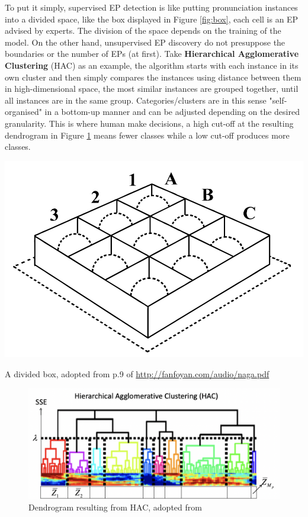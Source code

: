\documentclass[nobib]{tufte-handout}
\begin{document}
To put it simply, supervised EP detection is like putting pronunciation instances into a divided space, like the box displayed in Figure \ref{fig:box}, each cell is an EP advised by experts. The division of the space depends on the training of the model. On the other hand, unsupervised EP discovery do not presuppose the boundaries or the number of EPs (at first). Take \textbf{Hierarchical Agglomerative Clustering} (HAC) as an example, the algorithm starts with each instance in its own cluster and then simply compares the instances using distance between them in high-dimensional space, the most similar instances are grouped together, until all instances are in the same group. Categories/clusters are in this sense "self-organised" in a bottom-up manner and can be adjusted depending on the desired granularity. This is where human make decisions, a high cut-off at the resulting dendrogram in Figure \ref{fig:dendro} means fewer classes while a low cut-off produces more classes. 
\bigskip
\begin{marginfigure}
  \includegraphics{box.png}
  \caption{A divided box, adopted from p.9 of \url{http://fanfoyan.com/audio/naga.pdf}}
  \label{fig:box}
\end{marginfigure}
\vspace{5em}
\begin{figure}
  \includegraphics{dendro.png}
  \caption{Dendrogram resulting from HAC, adopted from \cite{wang2015supervised}}
  \label{fig:dendro}
\end{figure}
\end{document}
